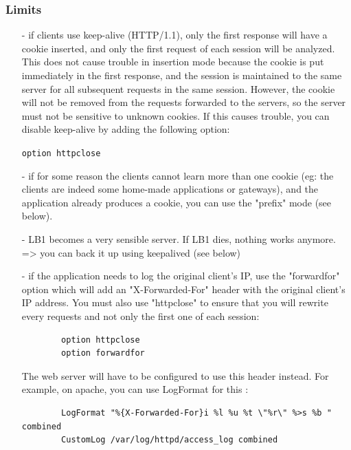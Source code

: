 \subsubsection{Limits}

\begin{itemize}
\item[-] if clients use keep-alive (HTTP/1.1), only the first response will have
   a cookie inserted, and only the first request of each session will be
   analyzed. This does not cause trouble in insertion mode because the cookie
   is put immediately in the first response, and the session is maintained to
   the same server for all subsequent requests in the same session. However,
   the cookie will not be removed from the requests forwarded to the servers,
   so the server must not be sensitive to unknown cookies. If this causes
   trouble, you can disable keep-alive by adding the following option:

        \verb|option httpclose|

\item[-] if for some reason the clients cannot learn more than one cookie (eg: the
   clients are indeed some home-made applications or gateways), and the
   application already produces a cookie, you can use the "prefix" mode (see
   below).

\item[-] LB1 becomes a very sensible server. If LB1 dies, nothing works anymore.
   => you can back it up using keepalived (see below)

\item[-] if the application needs to log the original client's IP, use the
   "forwardfor" option which will add an "X-Forwarded-For" header with the
   original client's IP address. You must also use "httpclose" to ensure
   that you will rewrite every requests and not only the first one of each
   session:

   \begin{verbatim}
        option httpclose
        option forwardfor
   \end{verbatim}

   The web server will have to be configured to use this header instead.
   For example, on apache, you can use LogFormat for this :
   \begin{verbatim}
        LogFormat "%{X-Forwarded-For}i %l %u %t \"%r\" %>s %b " combined
        CustomLog /var/log/httpd/access_log combined
   \end{verbatim}
\end{itemize}

